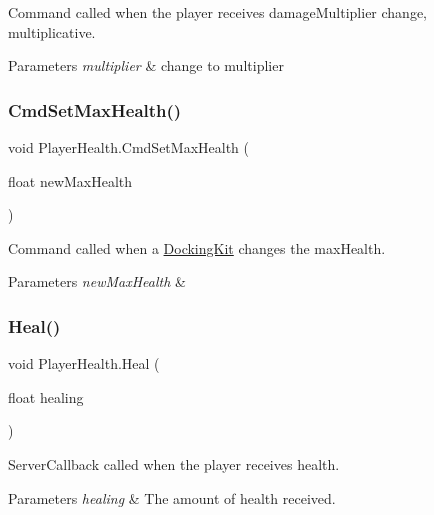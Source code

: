 Command called when the player receives damage\+Multiplier change, multiplicative. 


\begin{DoxyParams}{Parameters}
{\em multiplier} & change to multiplier\\
\hline
\end{DoxyParams}
\hypertarget{class_player_health_a568025d9187065c164ef7946654e0504}{}\label{class_player_health_a568025d9187065c164ef7946654e0504} 
\subsubsection{\texorpdfstring{Cmd\+Set\+Max\+Health()}{CmdSetMaxHealth()}}
{\footnotesize\ttfamily void Player\+Health.\+Cmd\+Set\+Max\+Health (\begin{DoxyParamCaption}\item[{float}]{new\+Max\+Health }\end{DoxyParamCaption})}



Command called when a \hyperlink{class_docking_kit}{Docking\+Kit} changes the max\+Health. 


\begin{DoxyParams}{Parameters}
{\em new\+Max\+Health} & \\
\hline
\end{DoxyParams}
\hypertarget{class_player_health_aae2aa8c904faf746f30ea39c5a9e76ae}{}\label{class_player_health_aae2aa8c904faf746f30ea39c5a9e76ae} 
\subsubsection{\texorpdfstring{Heal()}{Heal()}}
{\footnotesize\ttfamily void Player\+Health.\+Heal (\begin{DoxyParamCaption}\item[{float}]{healing }\end{DoxyParamCaption})}



Server\+Callback called when the player receives health. 


\begin{DoxyParams}{Parameters}
{\em healing} & The amount of health received.\\
\hline
\end{DoxyParams}
\hypertarget{class_player_health_ad2740e9dc726d6ac4931a08514ec64ff}{}\label{class_player_health_ad2740e9dc726d6ac4931a08514ec64ff} 
